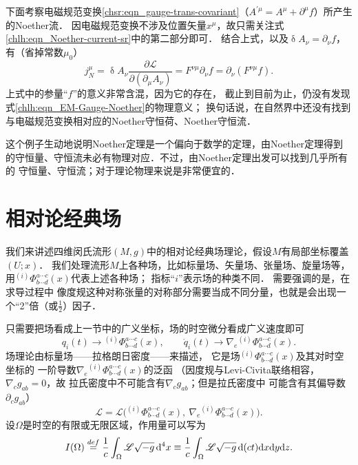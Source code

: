 下面考察电磁规范变换\eqref{chsr:eqn_gauge-trans-covariant}（$A^{\prime\mu} = A^\mu + \partial^\mu f$）所产生的Noether流．
因电磁规范变换不涉及位置矢量$x^\mu$，故只需关注式\eqref{chlh:eqn_Noether-current-sr}中的第二部分即可．
结合上式，以及$\updelta A_\nu = \partial_\nu f$，有（省掉常数$\mu_0$）
\begin{equation}\label{chlh:eqn_EM-Gauge-Noether}
    j^\mu_N = \updelta A_\nu \frac{\partial \mathscr{L}}{\partial(\partial_{\mu} A_\nu )}
    = F^{\nu\mu} \partial_\nu f = \partial_\nu (F^{\nu\mu} f) .
\end{equation}
上式中的参量“$f$”的意义非常含混，因为它的存在，
截止到目前为止，仍没有发现式\eqref{chlh:eqn_EM-Gauge-Noether}的物理意义；
换句话说，在自然界中还没有找到与电磁规范变换相对应的Noether守恒荷、Noether守恒流．

这个例子生动地说明Noether定理是一个偏向于数学的定理，由Noether定理得到
的守恒量、守恒流未必有物理对应．不过，由Noether定理出发可以找到几乎所有的
守恒量、守恒流；对于理论物理来说是非常便宜的．



\section{相对论经典场} \label{chlh:sec_field}
我们来讲述四维闵氏流形$(M,g)$中的相对论经典场理论，假设$M$有局部坐标覆盖$(U;x)$．
我们处理流形$M$上各种场，比如标量场、矢量场、张量场、旋量场等，
用${}^{(i)}\Phi^{a\cdots c}_{b\cdots d}(x)$代表上述各种场；
指标“$i$”表示场的种类不同．
需要强调的是，在求导过程中
像度规这种对称张量的对称部分需要当成不同分量，也就是会出现一个“2”倍（或$\frac{1}{2}$）因子．

只需要把场看成上一节中的广义坐标，场的时空微分看成广义速度即可
\begin{equation}
q_i(t) \to  {}^{(i)}\Phi^{a\cdots c}_{b\cdots d}(x), \qquad \dot{q}_i(t)
\to \nabla_{e}{}^{(i)}\Phi^{a\cdots c}_{b\cdots d}(x) .
\end{equation}
场理论由标量场——拉格朗日密度——来描述，
它是场${}^{(i)}\Phi^{a\cdots c}_{b\cdots d}(x)$及其对时空坐标的
一阶导数$\nabla_{e}{}^{(i)}\Phi^{a\cdots c}_{b\cdots d}(x)$的泛函
（因度规与Levi-Civita联络相容，$\nabla_cg_{ab}=0$，故
拉氏密度中不可能含有$\nabla_cg_{ab}$；但是拉氏密度中
可能含有其偏导数$\partial_c g_{ab}$）
\begin{equation}\label{chlh:eqn_Lagrange_density}
  \mathscr{L} = \mathscr{L}\bigl({}^{(i)}\Phi^{a\cdots c}_{b\cdots d}(x),\
   \nabla_{e}{}^{(i)}\Phi^{a\cdots c}_{b\cdots d}(x) \bigr) .
\end{equation}
设$\Omega$是时空的有限或无限区域，作用量可以写为
\begin{equation}\label{chlh:eqn_action}
  I(\Omega) \overset{def}{=} \frac{1}{c} \int_\Omega {\mathscr{L}} \sqrt{-g}\,{\rm d}^{4}x
    \equiv  \frac{1}{c} \int_\Omega {\mathscr{L}} \sqrt{-g} \,{{\rm d}(ct){\rm d}x {\rm d}y {\rm d}z} .
\end{equation}


